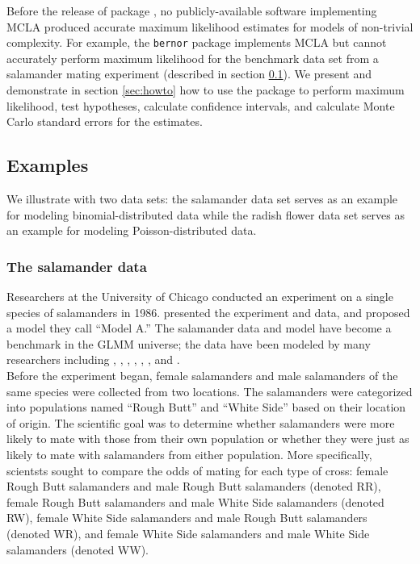 \documentclass[article]{jss}
\begin{document}
Before the release of  package , no publicly-available software  implementing MCLA  produced accurate maximum likelihood estimates for models of non-trivial complexity. For example, the \texttt{bernor}  package \citep{sung:geyer:2007} implements MCLA but cannot accurately perform maximum likelihood for the benchmark data set from a salamander mating experiment (described in section \ref{sec:examples}). 
We present     and demonstrate in section \ref{sec:howto} how to use the package to perform maximum likelihood, test hypotheses, calculate confidence intervals, and calculate Monte Carlo standard errors for the estimates.  


\subsection{Examples}\label{sec:examples}
We  illustrate  with two data sets: the salamander data set serves as an example for modeling binomial-distributed data while the radish flower data set serves as an example for modeling Poisson-distributed data.

\subsubsection{The salamander data}\label{sec:salex}

Researchers at the University of Chicago conducted an experiment on a single species of salamanders  in 1986.
 \citet[Section 14.5]{mcc:nelder:1989} presented the experiment and data, and \citet{karim:zeger:1992} proposed a model they call ``Model A.'' The salamander data and model have become a benchmark in the GLMM universe;  the data have been modeled by many researchers including \citet{booth:hobert:1999},  \citet{bres:clay:1993},   \citet{karim:zeger:1992}, \citet{mcc:nelder:1989},  \citet{schall:1991},  \citet{sung:geyer:2007}, and \citet{wolfinger:oconnell:1993}.\\




Before the experiment began, female salamanders and male salamanders of the same species were collected from two locations. The salamanders were categorized into populations named ``Rough Butt'' and ``White Side'' based on their location of origin. The scientific goal was to determine whether salamanders were more likely to mate with those from their own population or whether they were just as likely to mate with salamanders from either population. More specifically, scientsts sought to compare the odds of mating for each type of  cross: female Rough Butt salamanders and male Rough Butt salamanders (denoted RR), female Rough Butt salamanders and male White Side salamanders (denoted RW), female White Side salamanders and male Rough Butt salamanders (denoted WR), and female White Side salamanders and male White Side salamanders (denoted WW).    \\
\end{document}
